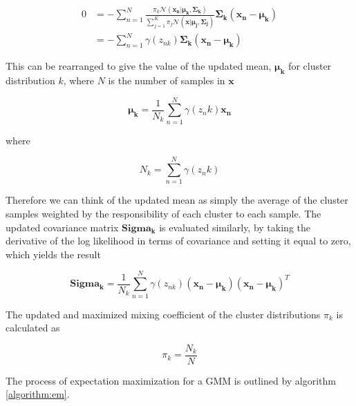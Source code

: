 \begin{align}
    0   &= -\sum^N_{n=1}\frac{\pi_k \mathcal{N}(\bm{x_n}|\bm{\mu_k},\bm{\Sigma_k})}{\sum\limits_{j=1}^{K}\pi_j\mathcal{N}(\bm{x}|\bm{\mu_j},        \bm{\Sigma_j})}\bm{\Sigma_k}(\bm{x_n} - \bm{\mu_k})\\
        &= -\sum^N_{n=1}\gamma(z_{nk})\bm{\Sigma_k}(\bm{x_n} - \bm{\mu_k})
    \label{eq:derivative_mean}
\end{align}

This can be rearranged to give the value of the updated mean, $\bm{\mu_k}$ for cluster distribution $k$, where $N$ is the number of samples in $\bm{x}$ 

\begin{equation}
    \label{eq:updated_mean}
    \bm{\mu_k} = \frac{1}{N_k}\sum_{n=1}^N \gamma(z_nk)\bm{x_n}
\end{equation}

where 

\begin{equation}
    \label{eq:nk}
    N_k = \sum_{n=1}^N \gamma(z_nk)
\end{equation}

Therefore we can think of the updated mean as simply the average of the cluster samples weighted by the responsibility of each cluster to each sample. The updated covariance matrix $\bm{Sigma_k}$ is evaluated similarly, by taking the derivative of the log likelihood in terms of covariance and setting it equal to zero, which yields the result

\begin{equation}
    \label{eq:updated_covariance}
    \bm{Sigma_k} = \frac{1}{N_k}\sum_{n=1}^{N}\gamma(z_{nk})(\bm{x_n}-\bm{\mu_k})(\bm{x_n}-\bm{\mu_k})^T 
\end{equation}

The updated and maximized mixing coefficient of the cluster distributions $\pi_k$ is calculated as 

\begin{equation}
    \label{eq:updated_mixing_coefficient}
    \pi_k = \frac{N_k}{N}
\end{equation}

The process of expectation maximization for a GMM is outlined by algorithm \ref{algorithm:em}.



